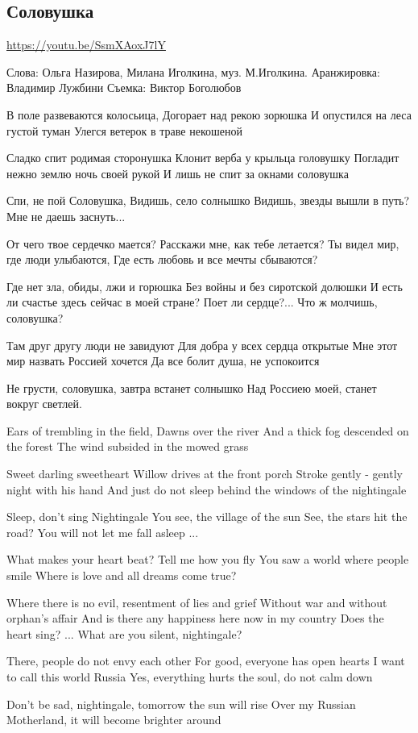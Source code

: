  
 
 
 
 
\subsection{Соловушка}

\url{https://youtu.be/SsmXAoxJ7lY}

Слова: Ольга Назирова, Милана Иголкина, муз. М.Иголкина. 
Аранжировка: Владимир Лужбини
Съемка: Виктор Боголюбов

В поле развеваются колосьица, 
Догорает над рекою зорюшка 
И опустился на леса густой туман 
Улегся ветерок в траве некошеной 

Сладко спит родимая сторонушка 
Клонит верба у крыльца головушку 
Погладит нежно землю ночь своей рукой 
И лишь не спит за окнами соловушка

Спи, не пой Соловушка, 
Видишь, село солнышко 
Видишь, звезды вышли в путь? 
Мне не даешь заснуть... 

От чего твое сердечко мается? 
Расскажи мне, как тебе летается? 
Ты видел мир, где люди улыбаются, 
Где есть любовь и все мечты сбываются? 

Где нет зла, обиды, лжи и горюшка 
Без войны и без сиротской долюшки 
И есть ли счастье здесь сейчас в моей стране?
Поет ли сердце?... Что ж молчишь, соловушка? 

Там друг другу люди не завидуют 
Для добра у всех сердца открытые 
Мне этот мир назвать Россией хочется 
Да все болит душа, не успокоится 

Не грусти, соловушка, завтра встанет солнышко 
Над Россиею моей, станет вокруг светлей.

Ears of trembling in the field,
Dawns over the river
And a thick fog descended on the forest
The wind subsided in the mowed grass

Sweet darling sweetheart
Willow drives at the front porch
Stroke gently - gently night with his hand
And just do not sleep behind the windows of the nightingale

Sleep, don't sing Nightingale
You see, the village of the sun
See, the stars hit the road?
You will not let me fall asleep ...

What makes your heart beat?
Tell me how you fly
You saw a world where people smile
Where is love and all dreams come true?

Where there is no evil, resentment of lies and grief
Without war and without orphan’s affair
And is there any happiness here now in my country
Does the heart sing? ...
What are you silent, nightingale?

There, people do not envy each other
For good, everyone has open hearts
I want to call this world Russia
Yes, everything hurts the soul, do not calm down

Don’t be sad, nightingale, tomorrow the sun will rise
Over my Russian Motherland, it will become brighter around
